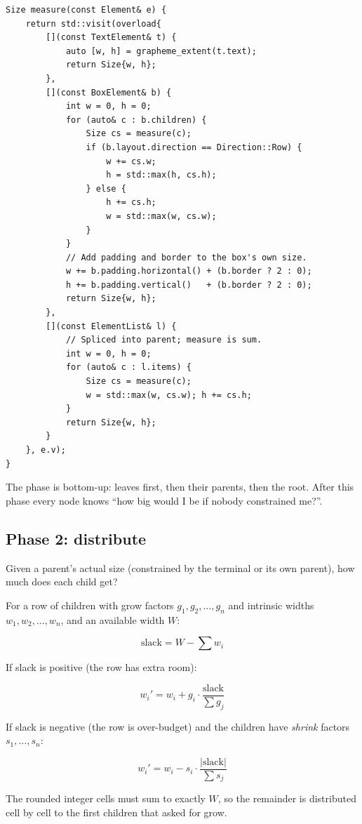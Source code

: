 \begin{lstlisting}
Size measure(const Element& e) {
    return std::visit(overload{
        [](const TextElement& t) {
            auto [w, h] = grapheme_extent(t.text);
            return Size{w, h};
        },
        [](const BoxElement& b) {
            int w = 0, h = 0;
            for (auto& c : b.children) {
                Size cs = measure(c);
                if (b.layout.direction == Direction::Row) {
                    w += cs.w;
                    h = std::max(h, cs.h);
                } else {
                    h += cs.h;
                    w = std::max(w, cs.w);
                }
            }
            // Add padding and border to the box's own size.
            w += b.padding.horizontal() + (b.border ? 2 : 0);
            h += b.padding.vertical()   + (b.border ? 2 : 0);
            return Size{w, h};
        },
        [](const ElementList& l) {
            // Spliced into parent; measure is sum.
            int w = 0, h = 0;
            for (auto& c : l.items) {
                Size cs = measure(c);
                w = std::max(w, cs.w); h += cs.h;
            }
            return Size{w, h};
        }
    }, e.v);
}
\end{lstlisting}

The phase is bottom-up: leaves first, then their parents, then
the root. After this phase every node knows ``how big would I be
if nobody constrained me?''.

\subsection*{Phase 2: distribute}

Given a parent's actual size (constrained by the terminal or its
own parent), how much does each child get?

For a row of children with grow factors $g_1, g_2, \ldots, g_n$
and intrinsic widths $w_1, w_2, \ldots, w_n$, and an available
width $W$:

\[
  \text{slack} = W - \sum w_i
\]

If slack is positive (the row has extra room):

\[
  w_i' = w_i + g_i \cdot \frac{\text{slack}}{\sum g_j}
\]

If slack is negative (the row is over-budget) and the children
have \emph{shrink} factors $s_1, \ldots, s_n$:

\[
  w_i' = w_i - s_i \cdot \frac{|\text{slack}|}{\sum s_j}
\]

The rounded integer cells must sum to exactly $W$, so the
remainder is distributed cell by cell to the first children
that asked for grow.

